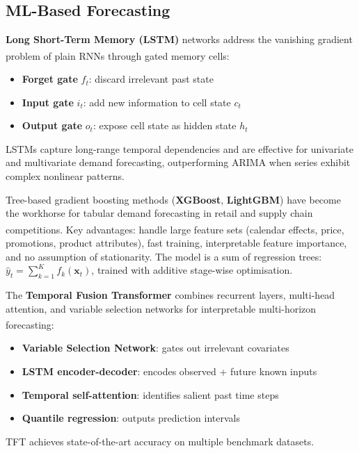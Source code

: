 \begin{tcbitemize}[ skin=sectionraster ]
\end{tcbitemize}

\subsection{ML-Based Forecasting}

\begin{tcbitemize}[ skin=sectionraster ]

    \tcbitem[title=LSTMs for Time Series, raster multicolumn=3]
    \textbf{Long Short-Term Memory (LSTM)} networks address the vanishing gradient problem of plain RNNs through gated memory cells\textsuperscript{\cite[][pp.~1748--1751]{limTemporalFusionTransformers2021}}:
    \begin{itemize}
        \item \textbf{Forget gate} $f_t$: discard irrelevant past state
        \item \textbf{Input gate} $i_t$: add new information to cell state $c_t$
        \item \textbf{Output gate} $o_t$: expose cell state as hidden state $h_t$
    \end{itemize}
    LSTMs capture long-range temporal dependencies and are effective for univariate and multivariate demand forecasting, outperforming ARIMA when series exhibit complex nonlinear patterns.

    \tcbitem[title=Gradient Boosting for Forecasting, raster multicolumn=3]
    Tree-based gradient boosting methods (\textbf{XGBoost}, \textbf{LightGBM}) have become the workhorse for tabular demand forecasting in retail and supply chain competitions\textsuperscript{\cite[][p.~905]{huberDataDrivenNewsvendor2019}}.
    Key advantages: handle large feature sets (calendar effects, price, promotions, product attributes), fast training, interpretable feature importance, and no assumption of stationarity.
    The model is a sum of regression trees: $\hat{y}_t = \sum_{k=1}^K f_k(\mathbf{x}_t)$, trained with additive stage-wise optimisation.

    \tcbitem[title=Temporal Fusion Transformer (TFT), raster multicolumn=3]
    The \textbf{Temporal Fusion Transformer} combines recurrent layers, multi-head attention, and variable selection networks for interpretable multi-horizon forecasting\textsuperscript{\cite[][pp.~1748--1764]{limTemporalFusionTransformers2021}}:
    \begin{itemize}
        \item \textbf{Variable Selection Network}: gates out irrelevant covariates
        \item \textbf{LSTM encoder-decoder}: encodes observed + future known inputs
        \item \textbf{Temporal self-attention}: identifies salient past time steps
        \item \textbf{Quantile regression}: outputs prediction intervals
    \end{itemize}
    TFT achieves state-of-the-art accuracy on multiple benchmark datasets.


\end{tcbitemize}
